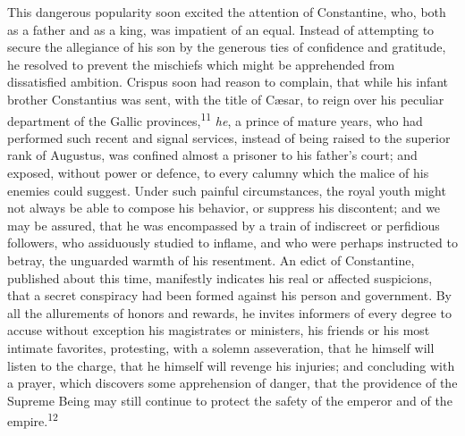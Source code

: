 
This dangerous popularity soon excited the attention of
Constantine, who, both as a father and as a king, was impatient
of an equal. Instead of attempting to secure the allegiance of
his son by the generous ties of confidence and gratitude, he
resolved to prevent the mischiefs which might be apprehended from
dissatisfied ambition. Crispus soon had reason to complain, that
while his infant brother Constantius was sent, with the title of
Cæsar, to reign over his peculiar department of the Gallic
provinces,\textsuperscript{11} \textit{he}, a prince of mature years, who had performed
such recent and signal services, instead of being raised to the
superior rank of Augustus, was confined almost a prisoner to his
father’s court; and exposed, without power or defence, to every
calumny which the malice of his enemies could suggest. Under such
painful circumstances, the royal youth might not always be able
to compose his behavior, or suppress his discontent; and we may
be assured, that he was encompassed by a train of indiscreet or
perfidious followers, who assiduously studied to inflame, and who
were perhaps instructed to betray, the unguarded warmth of his
resentment. An edict of Constantine, published about this time,
manifestly indicates his real or affected suspicions, that a
secret conspiracy had been formed against his person and
government. By all the allurements of honors and rewards, he
invites informers of every degree to accuse without exception his
magistrates or ministers, his friends or his most intimate
favorites, protesting, with a solemn asseveration, that he
himself will listen to the charge, that he himself will revenge
his injuries; and concluding with a prayer, which discovers some
apprehension of danger, that the providence of the Supreme Being
may still continue to protect the safety of the emperor and of
the empire.\textsuperscript{12}


